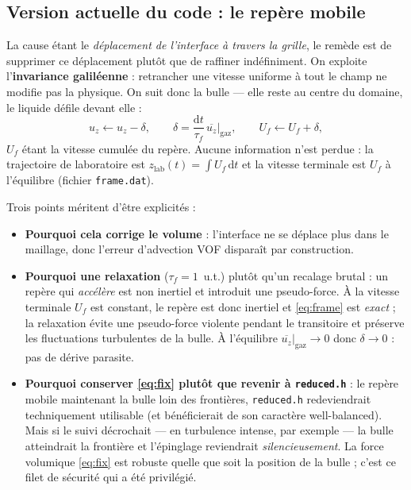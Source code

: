 \subsection{Version actuelle du code : le repère mobile}

La cause étant le \emph{déplacement de l'interface à travers la grille}, le remède
est de supprimer ce déplacement plutôt que de raffiner indéfiniment. On exploite
l'\textbf{invariance galiléenne} : retrancher une vitesse uniforme à tout le champ
ne modifie pas la physique. On suit donc la bulle --- elle reste au centre du
domaine, le liquide défile devant elle :
\begin{equation}
    u_z \leftarrow u_z - \delta, \qquad
    \delta = \frac{\mathrm{d}t}{\tau_f}\,\overline{u_z}\big|_{\text{gaz}},
    \qquad U_f \leftarrow U_f + \delta ,
    \label{eq:frame}
\end{equation}
$U_f$ étant la vitesse cumulée du repère. Aucune information n'est perdue : la
trajectoire de laboratoire est $z_{\text{lab}}(t) = \int U_f\,\mathrm{d}t$ et la
vitesse terminale est $U_f$ à l'équilibre (fichier \texttt{frame.dat}).

Trois points méritent d'être explicités :
\begin{itemize}
    \item \textbf{Pourquoi cela corrige le volume} : l'interface ne se déplace plus
    dans le maillage, donc l'erreur d'advection VOF disparaît par construction.
    \item \textbf{Pourquoi une relaxation} ($\tau_f = 1$~u.t.) plutôt qu'un recalage
    brutal : un repère qui \emph{accélère} est non inertiel et introduit une
    pseudo-force. À la vitesse terminale $U_f$ est constant, le repère est donc
    inertiel et \eqref{eq:frame} est \emph{exact} ; la relaxation évite une
    pseudo-force violente pendant le transitoire et préserve les fluctuations
    turbulentes de la bulle. À l'équilibre $\overline{u_z}|_{\text{gaz}}\to0$ donc
    $\delta\to0$ : pas de dérive parasite.
    \item \textbf{Pourquoi conserver \eqref{eq:fix} plutôt que revenir à
    \texttt{reduced.h}} : le repère mobile maintenant la bulle loin des frontières,
    \texttt{reduced.h} redeviendrait techniquement utilisable (et bénéficierait de
    son caractère well-balanced). Mais si le suivi décrochait --- en turbulence
    intense, par exemple --- la bulle atteindrait la frontière et l'épinglage
    reviendrait \emph{silencieusement}. La force volumique \eqref{eq:fix} est
    robuste quelle que soit la position de la bulle ; c'est ce filet de sécurité qui
    a été privilégié.
\end{itemize}

